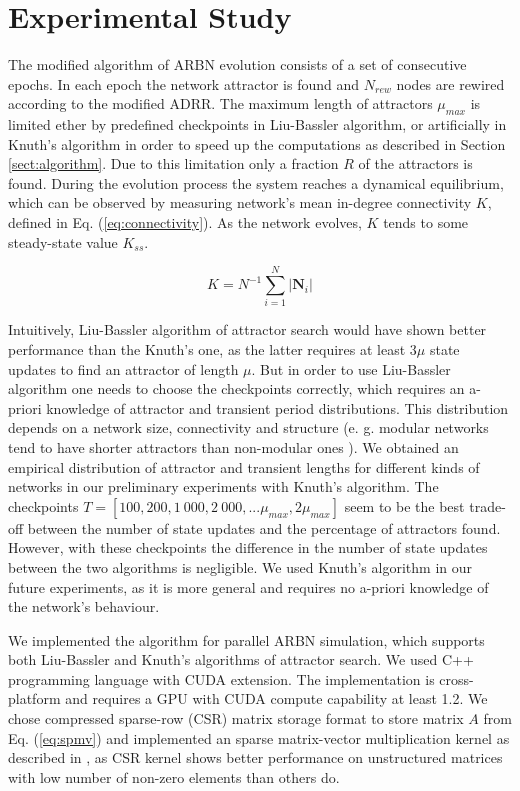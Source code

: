 \documentclass[procedia]{easychair}
\begin{document}
	
	\section{Experimental Study}
	\label{sect:experimental-study}
	
The modified algorithm of ARBN evolution consists of a set of consecutive epochs. In each epoch the network attractor is found and $N_{rew}$ nodes are rewired according to the modified ADRR. The maximum length of attractors $\mu_{max}$ is limited ether by predefined checkpoints in Liu-Bassler algorithm, or artificially in Knuth's algorithm in order to speed up the computations as described in Section \ref{sect:algorithm}. Due to this limitation only a fraction $R$ of the attractors is found. During the evolution process the system reaches a dynamical equilibrium, which can be observed by measuring network's mean in-degree connectivity $K$, defined in Eq. (\ref{eq:connectivity}). As the network evolves, $K$ tends to some steady-state value $K_{ss}$.
	
	
	\begin{equation}
	\label{eq:connectivity}
		K = N^{-1} \sum_{i=1}^{N} {|\mathbf{N}_i|}
	\end{equation}
	
	Intuitively, Liu-Bassler algorithm of attractor search would have shown better performance than the Knuth's one, as the latter requires at least $3 \mu$ state updates to find an attractor of length $\mu$. But in order to use Liu-Bassler algorithm one needs to choose the checkpoints correctly, which requires an a-priori knowledge of attractor and transient period distributions. This distribution depends on a network size, connectivity and structure (e. g. modular networks tend to have shorter attractors than non-modular ones \cite{Gorski2016}). We obtained an empirical distribution of attractor and transient lengths for different kinds of networks in our preliminary experiments with Knuth's algorithm. The checkpoints $T=[100, 200, 1~000, 2~000, ... \mu_{max}, 2 \mu_{max}]$ seem to be the best trade-off between the number of state updates and the percentage of attractors found. However, with these checkpoints the difference in the number of state updates between the two algorithms is negligible. We used Knuth's algorithm in our future experiments, as it is more general and requires no a-priori knowledge of the network's behaviour.
	
	We implemented the algorithm for parallel ARBN simulation, which supports both Liu-Bassler and Knuth's algorithms of attractor search. We used C++ programming language with CUDA extension. The implementation is cross-platform and requires a GPU with CUDA compute capability at least 1.2. We chose compressed sparse-row (CSR) matrix storage format to store matrix $A$ from Eq. (\ref{eq:spmv}) and implemented an sparse matrix-vector multiplication kernel as described in \cite{bell2008efficient}, as CSR kernel shows better performance on unstructured matrices with low number of non-zero elements than others do.
	
\end{document}
